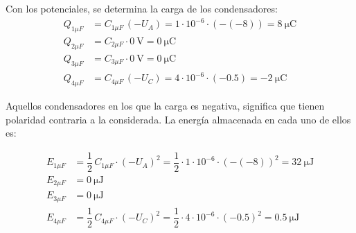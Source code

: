 \documentclass[10pt]{article}
\begin{document}
\vspace{4mm}
Con los potenciales, se determina la carga de los condensadores:
\begin{align*}
  Q_{1\mu F}&=C_{1\mu F}\, (-U_{A}) = 1\cdot 10^{-6}\cdot (-(-8))= \boxed{\qty{8}{\micro\coulomb}}\\
  Q_{2\mu F}&=C_{2\mu F} \cdot \qty{0}{\volt} = \boxed{\qty{0}{\micro\coulomb}}\\
  Q_{3\mu F}&=C_{3\mu F} \cdot \qty{0}{\volt} = \boxed{\qty{0}{\micro\coulomb}}\\
  Q_{4\mu F}&=C_{4\mu F}\, (-U_C) = 4\cdot 10^{-6}\cdot (-0.5)= \boxed{\qty{-2}{\micro\coulomb}}
\end{align*}

\vspace{4mm}
Aquellos condensadores en los que la carga es negativa, significa que tienen polaridad contraria a la considerada. La energía almacenada en cada uno de ellos es:

\begin{align*}
  E_{1\mu F}&=\dfrac{1}{2}\,C_{1\mu F}\cdot (-U_{A})^2 = \dfrac{1}{2}\cdot 1\cdot 10^{-6}\cdot (-(-8))^2= \boxed{\qty{32}{\micro\joule}}\\
  E_{2\mu F}&= \boxed{\qty{0}{\micro\joule}}\\
  E_{3\mu F}&= \boxed{\qty{0}{\micro\joule}}\\
  E_{4\mu F}&=\dfrac{1}{2}\,C_{4\mu F}\cdot (-U_{C})^2 = \dfrac{1}{2}\cdot 4\cdot 10^{-6}\cdot (-0.5)^2= \boxed{\qty{0.5}{\micro\joule}}
\end{align*}
\end{document}
